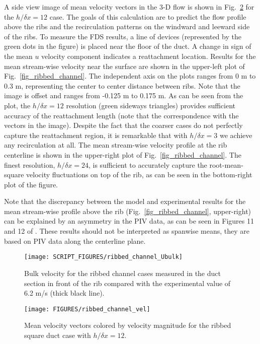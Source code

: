 \documentclass[11pt]{book}
\begin{document}
A side view image of mean velocity vectors in the 3-D flow is shown in Fig.~\ref{fig_ribbed_channel_image} for the $h/\delta x = 12$ case.  The goals of this calculation are to predict the flow profile above the ribs and the recirculation patterns on the windward and leeward side of the ribs.  To measure the FDS results, a line of devices (represented by the green dots in the figure) is placed near the floor of the duct.  A change in sign of the mean $u$ velocity component indicates a reattachment location.  Results for the mean stream-wise velocity near the surface are shown in the upper-left plot of Fig.~\ref{fig_ribbed_channel}.  The independent axis on the plots ranges from 0 m to 0.3 m, representing the center to center distance between ribs.  Note that the image is offset and ranges from -0.125 m to 0.175 m.  As can be seen from the plot, the $h/\delta x = 12$ resolution (green sideways triangles) provides sufficient accuracy of the reattachment length (note that the correspondence with the vectors in the image).  Despite the fact that the coarser cases do not perfectly capture the reattachment region, it is remarkable that with $h/\delta x = 3$ we achieve any recirculation at all.  The mean stream-wise velocity profile at the rib centerline is shown in the upper-right plot of Fig.~\ref{fig_ribbed_channel}. The finest resolution, $h/\delta x=24$, is sufficient to accurately capture the root-mean-square velocity fluctuations on top of the rib, as can be seen in the bottom-right plot of the figure.

Note that the discrepancy between the model and experimental results for the mean stream-wise profile above the rib (Fig.~\ref{fig_ribbed_channel}, upper-right) can be explained by an asymmetry in the PIV data, as can be seen in Figures 11 and 12 of \cite{Casara:2}.  These results should not be interpreted as spanwise means, they are based on PIV data along the centerline plane.

\begin{figure}[ht]
\centering
\texttt{[image: SCRIPT\_FIGURES/ribbed\_channel\_Ubulk]}
\caption[Bulk velocity  test case]{Bulk velocity for the ribbed channel cases measured in the duct section in front of the rib compared with the experimental value of 6.2 m/s (thick black line).}
\label{fig_ribbed_channel_Ubulk}
\end{figure}

\begin{figure}[ht]
\centering
\texttt{[image: FIGURES/ribbed\_channel\_vel]}
\caption[The  test case]{Mean velocity vectors colored by velocity magnitude for the ribbed square duct case with $h/\delta x = 12$.}
\label{fig_ribbed_channel_image}
\end{figure}
\end{document}
